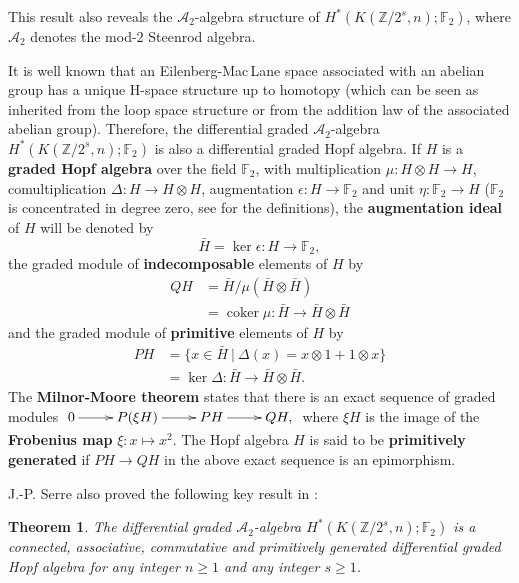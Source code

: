 \documentclass{amsart}
\newtheorem{thm}{Theorem}[section]
\theoremstyle{definition}
\theoremstyle{remark}
\DeclareMathOperator{\coker}{coker}
\newcommand{\Z}{\mathbb{Z}}
\newcommand{\F}{\mathbb{F}}
\newcommand{\A}{\mathcal{A}}
\renewcommand{\geq}{\geqslant}
\begin{document}

This result also reveals the $\A_2$-algebra structure of $H^*(K(\Z/2^s,n);\F_2)$, where $\A_2$ denotes the mod-$2$ Steenrod algebra. 

It is well known that an Eilenberg-Mac\,Lane space associated with an abelian group has a unique H-space structure up to homotopy (which can be seen as inherited from the loop space structure or from the addition law of the associated abelian group). Therefore, the differential graded $\A_2$-algebra $H^*(K(\Z/2^s,n);\F_2)$ is also a differential graded Hopf algebra. If $H$ is a {\bf graded Hopf algebra} over the field $\F_2$, with multiplication $\mu:H\otimes H\to H$, comultiplication $\Delta:H\to H\otimes H$, augmentation $\epsilon:H\to\F_2$ and unit $\eta:\F_2\to H$ ($\F_2$ is concentrated in degree zero, see \cite{MM65} for the definitions), the {\bf augmentation ideal} of $H$ will be denoted by
$$
\bar{H}=\ker\epsilon:H\to\F_2,
$$ the graded module of {\bf indecomposable} elements of $H$ by
\begin{align*}
QH&=\bar{H}/\mu(\bar{H}\otimes\bar{H})\\
&=\coker \mu:\bar{H}\to\bar{H}\otimes\bar{H}
\end{align*}
and the graded module of {\bf primitive} elements of $H$ by
\begin{align*}
PH&=\{x\in\bar{H}\ |\ \Delta(x)=x\otimes1+1\otimes x\}\\
&=\ker \Delta:\bar{H}\to\bar{H}\otimes\bar{H}.
\end{align*}  
The {\bf Milnor-Moore theorem}\label{t:Milnor-Moore} states that there is an exact sequence of graded modules
$\xymatrix{
0\ar[r] &P(\xi H)\ar[r] &PH\ar[r] &QH,
}$ where $\xi H$ is the image of the {\bf Frobenius map} $\xi:x\mapsto x^2$. The Hopf algebra $H$ is said to be {\bf primitively generated} if $PH\to QH$ in the above exact sequence is an epimorphism.

\medskip
J.-P. Serre also proved the following key result in \cite{Se53}:

\begin{thm}
The differential graded $\A_2$-algebra $H^*(K(\Z/2^s,n);\F_2)$ is a connected, associative, commutative and primitively generated differential graded Hopf algebra for any integer $n\geq1$ and any integer $s\geq1$.
\end{thm}
\end{document}
